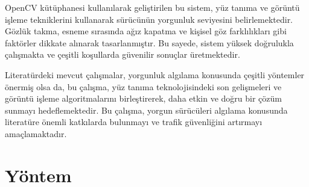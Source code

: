 \documentclass[12pt, a4paper]{article}
\begin{document}
	OpenCV kütüphanesi kullanılarak geliştirilen bu sistem, yüz tanıma ve görüntü işleme tekniklerini kullanarak sürücünün yorgunluk seviyesini belirlemektedir. Gözlük takma, esneme sırasında ağız kapatma ve kişisel göz farklılıkları gibi faktörler dikkate alınarak tasarlanmıştır. Bu sayede, sistem yüksek doğrulukla çalışmakta ve çeşitli koşullarda güvenilir sonuçlar üretmektedir.
	
	Literatürdeki mevcut çalışmalar, yorgunluk algılama konusunda çeşitli yöntemler önermiş olsa da, bu çalışma, yüz tanıma teknolojisindeki son gelişmeleri ve görüntü işleme algoritmalarını birleştirerek, daha etkin ve doğru bir çözüm sunmayı hedeflemektedir. Bu çalışma, yorgun sürücüleri algılama konusunda literatüre önemli katkılarda bulunmayı ve trafik güvenliğini artırmayı amaçlamaktadır.
	
	\section{Yöntem}
\end{document}
